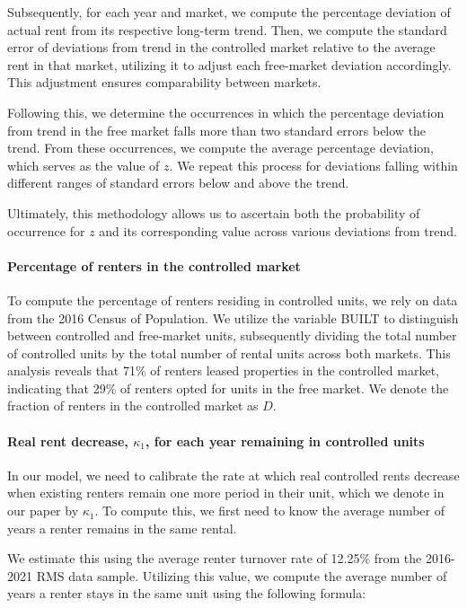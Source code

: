 \documentclass[parskip=full]{article}
\begin{document}
Subsequently, for each year and market, we compute the percentage deviation of actual rent from its respective long-term trend. Then, we compute the standard error of deviations from trend in the controlled market relative to the average rent in that market, utilizing it to adjust each free-market deviation accordingly. This adjustment ensures comparability between markets.

Following this, we determine the occurrences in which the percentage deviation from trend in the free market falls more than two standard errors below the trend. From these occurrences, we compute the average percentage deviation, which serves as the value of $z$. We repeat this process for deviations falling within different ranges of standard errors below and above the trend.

Ultimately, this methodology allows us to ascertain both the probability of occurrence for $z$ and its corresponding value across various deviations from trend.

\paragraph{Percentage of renters in the controlled market}

To compute the percentage of renters residing in controlled units, we rely on data from the 2016 Census of Population. We utilize the variable BUILT to distinguish between controlled and free-market units, subsequently dividing the total number of controlled units by the total number of rental units across both markets. This analysis reveals that 71\% of renters leased properties in the controlled market, indicating that 29\% of renters opted for units in the free market. We denote the fraction of renters in the controlled market as $D$.

\paragraph{Real rent decrease, $\kappa_{1}$, for each year remaining in controlled units}

In our model, we need to calibrate the rate at which real controlled rents decrease when existing renters remain one more period in their unit, which we denote in our paper by $\kappa_{1}$. To compute this, we first need to know the average number of years a renter remains in the same rental. 

We estimate this using the average renter turnover rate of 12.25\% from the 2016-2021 RMS data sample. Utilizing this value, we compute the average number of years a renter stays in the same unit using the following formula:
\end{document}
